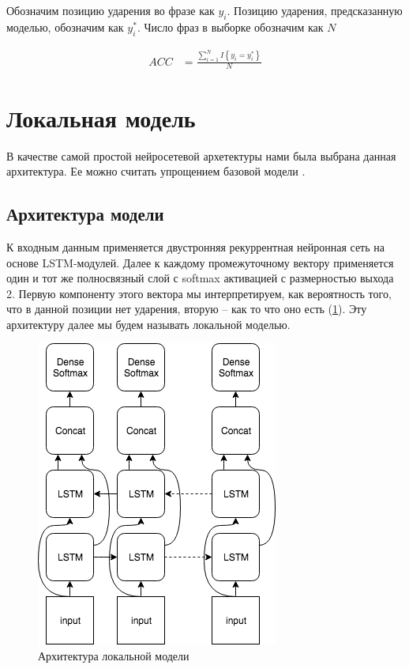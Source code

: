 \documentclass[14pt, a4paper, russian]{extreport}
\begin{document}
Обозначим позицию ударения во фразе как $y_i$. Позицию ударения, предсказанную моделью, обозначим как $y^*_i$. Число фраз в выборке обозначим как $N$

\begin{align}
\label{eq:acc} ACC &= \frac{\sum\limits_{i=1}^{N}I \left\{y_i = y^*_i\right\}}{N} 
\end{align}

\section{Локальная модель}
В качестве самой простой нейросетевой архетектуры нами была выбрана данная архитектура. Ее можно считать упрощением базовой модели \cite{ponomareva}.
\subsection{Архитектура модели}
К входным данным применяется двустронняя рекуррентная нейронная сеть на основе LSTM-модулей. Далее к каждому промежуточному вектору применяется один и тот же полносвязный слой с softmax активацией с размерностью выхода 2. Первую компоненту этого вектора мы интерпретируем, как вероятность того, что в данной позиции нет ударения, вторую -- как то что оно есть (\cref{fig:local}). Эту архитектуру далее мы будем называть локальной моделью. 

\begin{figure}[H]
	\begin{center}
		\includegraphics[width=0.5\linewidth]{Local}
	\end{center}
	\caption{\small{Архитектура локальной модели}}
	\label{fig:local}
\end{figure}
\end{document}
